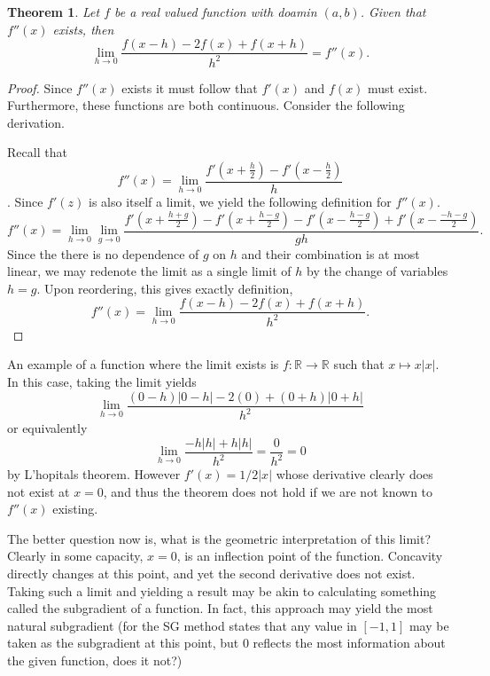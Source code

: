 \documentclass[letter]{article}
\newtheorem{theorem}{Theorem}
\newenvironment{menumerate}{%
  \edef\backupindent{\the\parindent}%
  \enumerate%
  \setlength{\parindent}{\backupindent}%
}{\endenumerate}
\begin{document}
\begin{menumerate}
	\setcounter{enumi}{10}
	\item 
	\begin{menumerate}
	 \item
	 \begin{theorem}
		Let $f$ be a real valued function with doamin $(a,b)$. Given that $f''(x)$ exists, then
		$$\lim_{h\to 0} \frac{f(x-h) - 2f(x) + f(x+h)}{h^2} = f''(x).$$
	\end{theorem}
	\begin{proof}
	Since $f''(x)$ exists it must follow that $f'(x)$ and $f(x)$ must exist. Furthermore, these functions are both continuous. Consider the following derivation. 

	Recall that $$f''(x) = \lim_{h\to0}\frac{f'(x+\frac{h}{2}) - f'(x-\frac{h}{2})}{h}$$. Since $f'(z)$ is also itself a limit, we yield the following definition for $f''(x).$
	$$f''(x) = \lim_{h\to0}\lim_{g\to 0} \frac{f'(x+\frac{h+g}{2}) - f'(x + \frac{h - g}{2}) - f'(x -\frac{h-g}{2}) + f'(x-\frac{-h-g}{2})}{gh}.$$
	Since the there is no dependence of $g$ on $h$ and their combination is at most linear, we may redenote the limit as a single limit of $h$ by the change of variables $h=g.$ Upon reordering, this gives exactly definition,
	$$ f''(x)=\lim_{h\to 0} \frac{f(x-h) - 2f(x) + f(x+h)}{h^2}. $$
	\end{proof}
	 \item An example of a function where the limit exists is $f:\mathbb{R} \to \mathbb{R}$ such that $x \mapsto x|x|.$ In this case, taking the limit yields
	  $$ \lim_{h\to 0} \frac{(0-h)|0-h| - 2(0) + (0+h)|0+h|}{h^2}$$
	  or equivalently
	  $$ \lim_{h \to 0} \frac{-h|h| + h|h|}{h^2} = \frac{0}{h^2} = 0$$
	  by L'hopitals theorem. However $f'(x) = 1/2|x|$ whose derivative clearly does not exist at $x= 0$, and thus the theorem does not hold if we are not known to $f''(x)$ existing.


	The better question now is, what is the geometric interpretation of this limit? Clearly in some capacity, $x=0$, is an inflection point of the function. Concavity directly changes at this point, and yet the second derivative does not exist. Taking such a limit and yielding a result may be akin to calculating something called the subgradient of a function. In fact, this approach may yield the most natural subgradient (for the SG method states that any value in $[-1,1]$ may be taken as the subgradient at this point, but $0$ reflects the most information about the given function, does it not?)
	\end{menumerate}


\end{menumerate}
\end{document}
